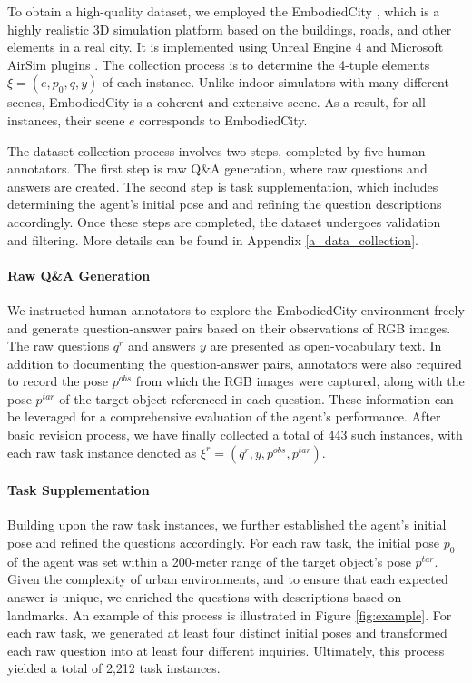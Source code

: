 To obtain a high-quality dataset, we employed the EmbodiedCity \cite{gao2024embodiedcity}, which is a highly realistic 3D simulation platform based on the buildings, roads, and other elements in a real city. It is implemented using Unreal Engine 4 \cite{sanders2016introduction} and Microsoft AirSim plugins \cite{shah2018airsim}. The collection process is to determine the 4-tuple elements $\xi =(e,{{p}_{0}},q,y)$ of each instance. Unlike indoor simulators with many different scenes, EmbodiedCity is a coherent and extensive scene. As a result, for all instances, their scene $e$ corresponds to EmbodiedCity.

The dataset collection process involves two steps, completed by five human annotators. The first step is raw Q\&A generation, where raw questions and answers are created. The second step is task supplementation, which includes determining the agent's initial pose and and refining the question descriptions accordingly. Once these steps are completed, the dataset undergoes validation and filtering. More details can be found in Appendix \ref{a_data_collection}.  

\paragraph{Raw Q\&A Generation} 

We instructed human annotators to explore the EmbodiedCity environment freely and generate question-answer pairs based on their observations of RGB images. The raw questions ${q^r}$ and answers $y$ are presented as open-vocabulary text. In addition to documenting the question-answer pairs, annotators were also required to record the pose ${p^{obs}}$ from which the RGB images were captured, along with the pose ${p^{tar}}$ of the target object referenced in each question. These information can be leveraged for a comprehensive evaluation of the agent's performance. After basic revision process, we have finally collected a total of 443 such instances, with each raw task instance denoted as ${\xi ^r} = ({q^r}, y, {p^{obs}}, {p^{tar}})$.

\paragraph{Task Supplementation} 

Building upon the raw task instances, we further established the agent's initial pose and refined the questions accordingly. For each raw task, the initial pose \( p_{0} \) of the agent was set within a 200-meter range of the target object's pose \( p^{tar} \). Given the complexity of urban environments, and to ensure that each expected answer is unique, we enriched the questions with descriptions based on landmarks. An example of this process is illustrated in Figure \ref{fig:example}. For each raw task, we generated at least four distinct initial poses and transformed each raw question into at least four different inquiries. Ultimately, this process yielded a total of 2,212 task instances.


